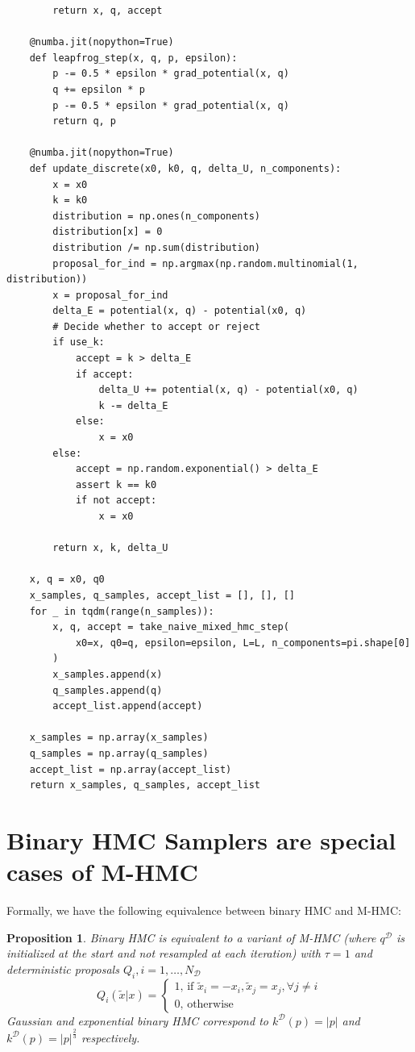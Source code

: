 \documentclass{article}
\newcommand{\cald}{\mathcal{D}}
\newtheorem{proposition}{Proposition}
\begin{document}
\begin{verbatim}
        return x, q, accept

    @numba.jit(nopython=True)
    def leapfrog_step(x, q, p, epsilon):
        p -= 0.5 * epsilon * grad_potential(x, q)
        q += epsilon * p
        p -= 0.5 * epsilon * grad_potential(x, q)
        return q, p

    @numba.jit(nopython=True)
    def update_discrete(x0, k0, q, delta_U, n_components):
        x = x0
        k = k0
        distribution = np.ones(n_components)
        distribution[x] = 0
        distribution /= np.sum(distribution)
        proposal_for_ind = np.argmax(np.random.multinomial(1, distribution))
        x = proposal_for_ind
        delta_E = potential(x, q) - potential(x0, q)
        # Decide whether to accept or reject
        if use_k:
            accept = k > delta_E
            if accept:
                delta_U += potential(x, q) - potential(x0, q)
                k -= delta_E
            else:
                x = x0
        else:
            accept = np.random.exponential() > delta_E
            assert k == k0
            if not accept:
                x = x0

        return x, k, delta_U

    x, q = x0, q0
    x_samples, q_samples, accept_list = [], [], []
    for _ in tqdm(range(n_samples)):
        x, q, accept = take_naive_mixed_hmc_step(
            x0=x, q0=q, epsilon=epsilon, L=L, n_components=pi.shape[0]
        )
        x_samples.append(x)
        q_samples.append(q)
        accept_list.append(accept)

    x_samples = np.array(x_samples)
    q_samples = np.array(q_samples)
    accept_list = np.array(accept_list)
    return x_samples, q_samples, accept_list
\end{verbatim}
\section{Binary HMC Samplers are special cases of M-HMC}\label{sec:expressions}

Formally, we have the following equivalence between binary HMC and M-HMC:

\begin{proposition}
	Binary HMC is equivalent to a variant of M-HMC (where $q^\cald$ is initialized at the start and not resampled at each iteration) with $\tau=1$ and deterministic proposals $Q_i,  i = 1, \ldots, N_\cald$
\begin{equation*}
	Q_i (\tilde{x}|x) = \begin{cases}1\text{, if }\tilde{x}_i = - x_i, \tilde{x}_j = x_j, \forall j \neq i\\0\text{, otherwise}\end{cases}
\end{equation*}
Gaussian and exponential binary HMC correspond to $k^\cald(p)=|p|$ and $k^\cald(p)=|p|^{\frac{2}{3}}$ respectively.
\end{proposition}
\end{document}
